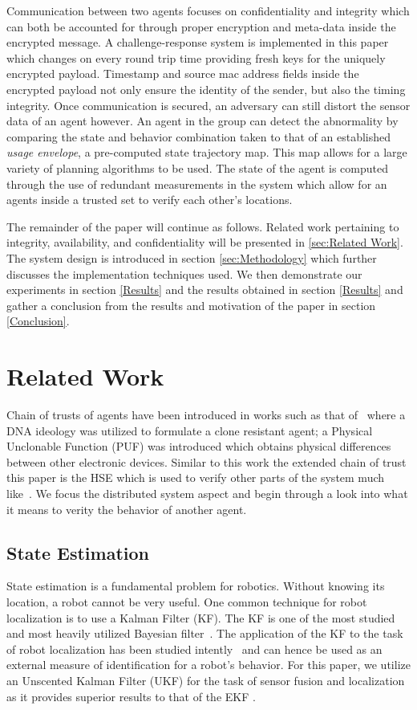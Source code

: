 \documentclass[conference]{IEEEtran}
\begin{document}
Communication between two agents focuses on confidentiality and integrity which can both be accounted for through proper encryption and meta-data inside the encrypted message. A challenge-response system is implemented in this paper which changes on every round trip time providing fresh keys for the uniquely encrypted payload. Timestamp and source mac address fields inside the encrypted payload not only ensure the identity of the sender, but also the timing integrity. Once communication is secured, an adversary can still distort the sensor data of an agent however. An agent in the group can detect the abnormality by comparing the state and behavior combination taken to that of an established \textit{usage envelope}, a pre-computed state trajectory map. This map allows for a large variety of planning algorithms to be used. The state of the agent is computed through the use of redundant measurements in the system which allow for an agents inside a trusted set to verify each other's locations.

The remainder of the paper will continue as follows. Related work pertaining to integrity, availability, and confidentiality will be presented in \autoref{sec:Related Work}. The system design is introduced in section \autoref{sec:Methodology} which further discusses the implementation techniques used. We then demonstrate our experiments in section \autoref{Results} and the results obtained in section \autoref{Results} and gather a conclusion from the results and motivation of the paper in section \autoref{Conclusion}.

\section{Related Work} \label{sec:Related Work}
Chain of trusts of agents have been introduced in works such as that of~\textcite{adi2009mechatronic} where a DNA ideology was utilized to formulate a clone resistant agent; a Physical Unclonable Function (PUF) was introduced which obtains physical differences between other electronic devices. Similar to this work the extended chain of trust this paper is the HSE which is used to verify other parts of the system much like~\textcite{adi2009mechatronic}. We focus the distributed system aspect and begin through a look into what it means to verity the behavior of another agent.

\subsection{State Estimation}
State estimation is a fundamental problem for robotics. Without knowing its location, a robot cannot be very useful. One common technique for robot localization is to use a Kalman Filter (KF). The KF is one of the most studied and most heavily utilized Bayesian filter~\cite[39-81]{ProbabilisticRobotics}. The application of the KF to the task of robot localization has been studied intently~\cite{Localization2003, Mohsin2014} and can hence be used as an external measure of identification for a robot's behavior. For this paper, we utilize an Unscented Kalman Filter (UKF) for the task of sensor fusion and localization as it provides superior results to that of the EKF \cite{Thrun2002Probabilistic}.
\end{document}
